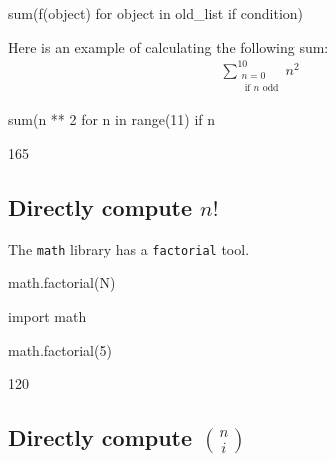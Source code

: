 \begin{api}
sum(f(object) for object in old_list if condition)
\end{api}


Here is an example of calculating the following sum:
\begin{equation*}
\begin{split}
    \sum_{\begin{array}{c}n=0\\\text{ if }n\text{ odd}\end{array}}^{10} n ^ 2
\end{split}
\end{equation*}



\begin{pyin}
sum(n ** 2 for n in range(11) if n %
\end{pyin}





\begin{raw}
165
\end{raw}





\subsection{Directly compute \(n!\)}
\label{\detokenize{tools-for-mathematics/05-combinations-permutations/how/main:directly-computing-n}}

The \texttt{math} library has a \texttt{factorial} tool.


\begin{api}
math.factorial(N)
\end{api}





\begin{pyin}
import math

math.factorial(5)
\end{pyin}





\begin{raw}
120
\end{raw}





\subsection{Directly compute \({n \choose i}\)}
\label{\detokenize{tools-for-mathematics/05-combinations-permutations/how/main:directly-computing-n-choose-i}}

